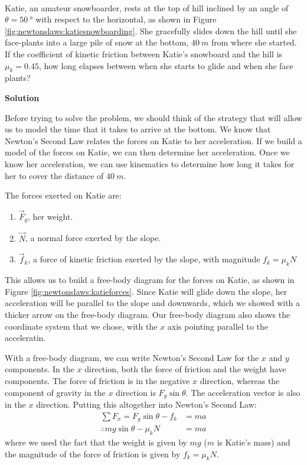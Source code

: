\begin{problem}\\ Katie, an amateur snowboarder, rests at the top of hill inclined by an angle of $\theta =\SI{50}{\degree}$ with respect to the horizontal, as shown in Figure \ref{fig:newtonslaws:katiesnowboarding}. She gracefully slides down the hill until she face-plants into a large pile of snow at the bottom, $\SI{40}{m}$ from where she started. If the coefficient of kinetic friction between Katie's snowboard and the hill is $\mu_k=0.45$, how long elapses between when she starts to glide and when she face plants?


\textbf{Solution}

Before trying to solve the problem, we should think of the strategy that will allow us to model the time that it takes to arrive at the bottom. We know that Newton's Second Law relates the forces on Katie to her acceleration. If we build a model of the forces on Katie, we can then determine her acceleration. Once we know her acceleration, we can use kinematics to determine how long it takes for her to cover the distance of $\SI{40}{m}$.

The forces exerted on Katie are:
\begin{enumerate}
\item $\vec F_g$, her weight.
\item $\vec N$, a normal force exerted by the slope.
\item $\vec f_k$, a force of kinetic friction exerted by the slope, with magnitude $f_k=\mu_kN$ 
\end{enumerate}

This allows us to build a free-body diagram for the forces on Katie, as shown in Figure \ref{fig:newtonslaws:katieforces}. Since Katie will glide down the slope, her acceleration will be parallel to the slope and downwards, which we showed with a thicker arrow on the free-body diagram. Our free-body diagram also shows the coordinate system that we chose, with the $x$ axis pointing parallel to the acceleratin. 


With a free-body diagram, we can write Newton's Second Law for the $x$ and $y$ components. In the $x$ direction, both the force of friction and the weight have components. The force of friction is in the negative $x$ direction, whereas the component of gravity in the $x$ direction is $F_g\sin\theta$. The acceleration vector is also in the $x$ direction. Putting this altogether into Newton's Second Law:
\begin{align*}
\sum F_x = F_g\sin\theta - f_k &= ma\\
\therefore mg\sin\theta -\mu_k N &= ma
\end{align*}
where we used the fact that the weight is given by $mg$ ($m$ is Katie's mass) and the magnitude of the force of friction is given by $f_k=\mu_kN$.


\end{problem}
